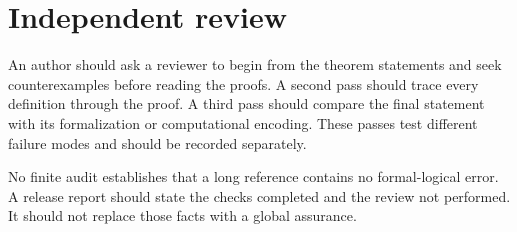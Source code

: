 \section{Independent review}
\label{sec:research-workflow-04}

An author should ask a reviewer to begin from the theorem statements and seek
counterexamples before reading the proofs.  A second pass should trace every
definition through the proof.  A third pass should compare the final statement
with its formalization or computational encoding.  These passes test different
failure modes and should be recorded separately.

\begin{warning}
No finite audit establishes that a long reference contains no formal-logical
error.  A release report should state the checks completed and the review not
performed.  It should not replace those facts with a global assurance.
\end{warning}
